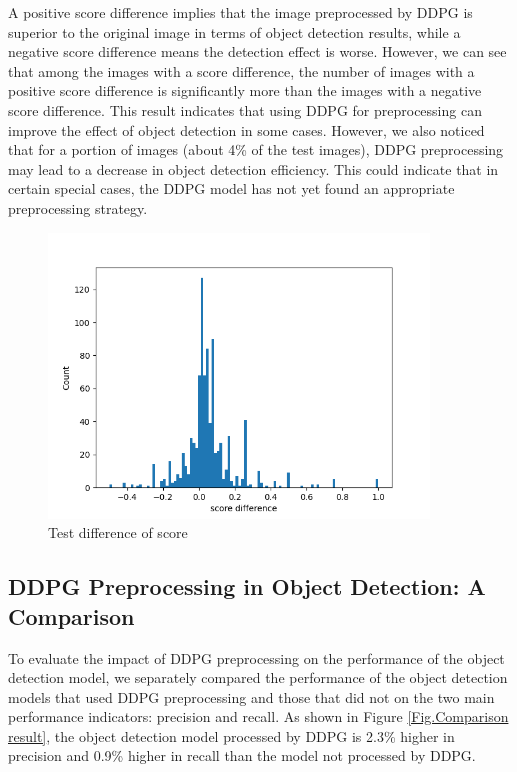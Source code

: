 \documentclass[PhD]{PHlab-thesis}
\begin{document}
A positive score difference implies that the image preprocessed by DDPG is superior to the original image in terms of object detection results, while a negative score difference means the detection effect is worse. However, we can see that among the images with a score difference, the number of images with a positive score difference is significantly more than the images with a negative score difference. This result indicates that using DDPG for preprocessing can improve the effect of object detection in some cases. However, we also noticed that for a portion of images (about 4\% of the test images), DDPG preprocessing may lead to a decrease in object detection efficiency. This could indicate that in certain special cases, the DDPG model has not yet found an appropriate preprocessing strategy.
\begin{figure}[!htb] 
    \centering 
    \includegraphics[width=0.9\textwidth]{images/test difference of score.png}
    \caption{Test difference of score} 
    \label{Fig./Test difference of score} 
\end{figure}

\subsection{DDPG Preprocessing in Object Detection: A Comparison}
To evaluate the impact of DDPG preprocessing on the performance of the object detection model, we separately compared the performance of the object detection models that used DDPG preprocessing and those that did not on the two main performance indicators: precision and recall. As shown in Figure \ref{Fig.Comparison result}, the object detection model processed by DDPG is 2.3\% higher in precision and 0.9\% higher in recall than the model not processed by DDPG.
\end{document}
